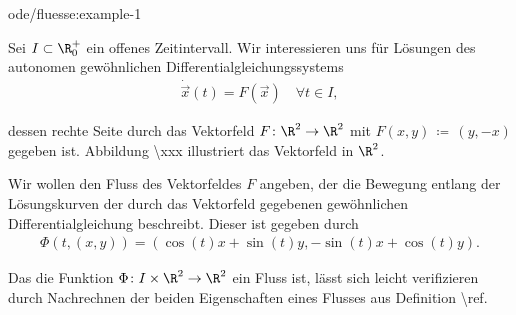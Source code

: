\documentclass[letterpaper,10pt,german]{jupyterBook}
\begin{document}
\begin{example}{}{ode/fluesse:example-1}



\par
Sei \(I\subset \R_0^+\) ein offenes Zeitintervall.
Wir interessieren uns für Lösungen des autonomen gewöhnlichen Differentialgleichungssystems
\begin{align*}
\dot{\vec{x}}(t) = F(\vec{x}) \quad \forall t\in I,
\end{align*}
\par
dessen rechte Seite durch das Vektorfeld \(F \colon \R^2 \rightarrow \R^2\) mit \(F(x,y) \, \coloneqq \, (y, -x)\) gegeben ist.
Abbildung \textbackslash{}xxx illustriert das Vektorfeld in \(\R^2\).

\par
Wir wollen den Fluss des Vektorfeldes \(F\) angeben, der die Bewegung entlang der Lösungskurven der durch das Vektorfeld gegebenen gewöhnlichen Differentialgleichung beschreibt.
Dieser ist gegeben durch
\begin{align*}
\Phi(t,(x,y)) = (\cos(t)x + \sin(t)y, -\sin(t)x + \cos(t)y).
\end{align*}
\par
Das die Funktion \(\Phi \colon I \times \R^2 \rightarrow \R^2\) ein Fluss ist, lässt sich leicht verifizieren durch Nachrechnen der beiden Eigenschaften eines Flusses aus Definition \textbackslash{}ref.


\end{example}
\end{document}
